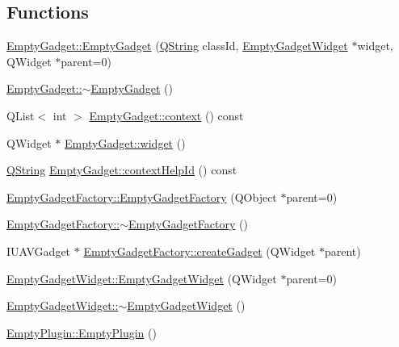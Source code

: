 \subsection*{\-Functions}
\begin{DoxyCompactItemize}
\item 
\hyperlink{group___empty_gadget_plugin_ga8dd994979515e846487d11c9ee923175}{\-Empty\-Gadget\-::\-Empty\-Gadget} (\hyperlink{group___u_a_v_objects_plugin_gab9d252f49c333c94a72f97ce3105a32d}{\-Q\-String} class\-Id, \hyperlink{class_empty_gadget_widget}{\-Empty\-Gadget\-Widget} $\ast$widget, \-Q\-Widget $\ast$parent=0)
\item 
\hyperlink{group___empty_gadget_plugin_ga4c9294b56cd062b22669146def8c2cde}{\-Empty\-Gadget\-::$\sim$\-Empty\-Gadget} ()
\item 
\-Q\-List$<$ int $>$ \hyperlink{group___empty_gadget_plugin_ga640557d465e9e57a080f459f9ba33c53}{\-Empty\-Gadget\-::context} () const 
\item 
\-Q\-Widget $\ast$ \hyperlink{group___empty_gadget_plugin_gaf90ce4fcadfb337055b06effe0fa08cb}{\-Empty\-Gadget\-::widget} ()
\item 
\hyperlink{group___u_a_v_objects_plugin_gab9d252f49c333c94a72f97ce3105a32d}{\-Q\-String} \hyperlink{group___empty_gadget_plugin_ga9ce48ac1c22eba730811d0885ecc9606}{\-Empty\-Gadget\-::context\-Help\-Id} () const 
\item 
\hyperlink{group___empty_gadget_plugin_gaf98a291f00c46f8dfde8d7c9d6f8fb6c}{\-Empty\-Gadget\-Factory\-::\-Empty\-Gadget\-Factory} (\-Q\-Object $\ast$parent=0)
\item 
\hyperlink{group___empty_gadget_plugin_gabec68115923f555ddd7cc38ba7a3ee80}{\-Empty\-Gadget\-Factory\-::$\sim$\-Empty\-Gadget\-Factory} ()
\item 
\-I\-U\-A\-V\-Gadget $\ast$ \hyperlink{group___empty_gadget_plugin_gaf091c2a41b028c469236b6ad70d4addf}{\-Empty\-Gadget\-Factory\-::create\-Gadget} (\-Q\-Widget $\ast$parent)
\item 
\hyperlink{group___empty_gadget_plugin_ga49fd1e7c797821911cc8c1aaf39af255}{\-Empty\-Gadget\-Widget\-::\-Empty\-Gadget\-Widget} (\-Q\-Widget $\ast$parent=0)
\item 
\hyperlink{group___empty_gadget_plugin_ga31f0094726f11e434e12aaa0a764d467}{\-Empty\-Gadget\-Widget\-::$\sim$\-Empty\-Gadget\-Widget} ()
\item 
\hyperlink{group___empty_gadget_plugin_ga18898df1886d72c9e78700927c8f57c6}{\-Empty\-Plugin\-::\-Empty\-Plugin} ()
\item 

\end{DoxyCompactItemize}
